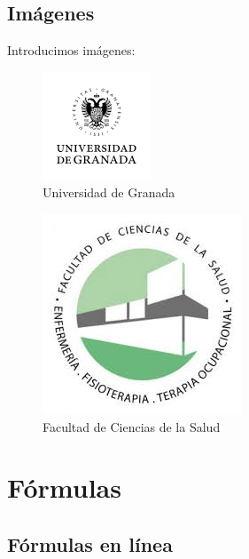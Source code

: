 \documentclass[a4paper,11pt]{article}
\begin{document}
\subsection{Imágenes}

Introducimos imágenes:

\begin{multicols}{2}
	
	\begin{figure}[H]
		\caption{Universidad de Granada}
		\centering
		\includegraphics[width=0.5\linewidth]{ugr}
	\end{figure}

	\begin{figure}[H]
		\caption{Facultad de Ciencias de la Salud}
		\centering
		\includegraphics[width=0.5\linewidth]{fcs}
	\end{figure}

\end{multicols}


\section{Fórmulas}

\subsection{Fórmulas en línea}
\end{document}
